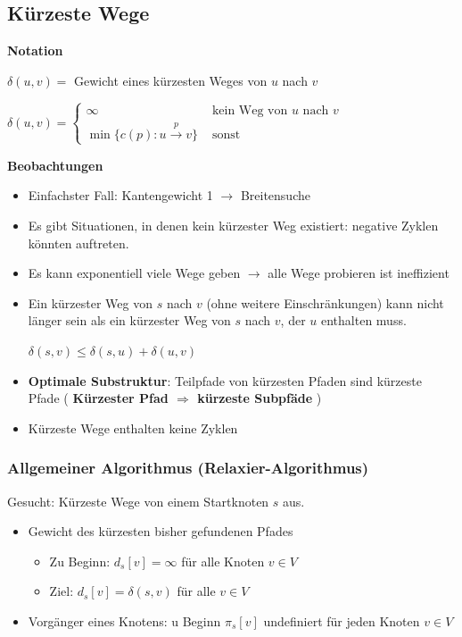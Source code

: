 \vspace{-4pt}
\begin{sectionbox}
\subsection{Kürzeste Wege}\smallskip
\textbf{Notation}\par\smallskip
$\delta(u, v)=$ Gewicht eines kürzesten Weges von $u$ nach $v$\par
$\delta(u, v)=\left\{\begin{array}{ll}
\infty & \text { kein Weg von } u \text { nach } v \\
\min \{c(p): u \stackrel{p}{\longrightarrow} v\} & \text { sonst }
\end{array}\right.$\par\smallskip

\textbf{Beobachtungen}\par
\begin{itemize}
    \item Einfachster Fall: Kantengewicht 1 $\rightarrow$ Breitensuche
    \item Es gibt Situationen, in denen kein kürzester Weg existiert: negative Zyklen könnten auftreten.
    \item Es kann exponentiell viele Wege geben $\rightarrow$  alle Wege probieren ist ineffizient
    \item Ein kürzester Weg von $s$ nach $v$ (ohne weitere Einschränkungen) kann nicht länger sein als ein kürzester Weg von $s$ nach $v$, der $u$ enthalten muss.\par
    \textcolor{tanne}{\textbf{$\delta(s, v) \leq \delta(s, u)+\delta(u, v)$}}
    \item \textbf{Optimale Substruktur}: Teilpfade von kürzesten Pfaden sind kürzeste Pfade ( \textbf{\textcolor{tanne}{Kürzester Pfad $\Rightarrow$ kürzeste Subpfäde}} )
    \item Kürzeste Wege enthalten keine Zyklen
\end{itemize}\par
\end{sectionbox}
\vspace{-4pt}
\begin{sectionbox}
\subsubsection{Allgemeiner Algorithmus (Relaxier-Algorithmus)}\smallskip
Gesucht: Kürzeste Wege von einem Startknoten $s$ aus.
\begin{itemize}
    \item Gewicht des kürzesten bisher gefundenen Pfades
    \begin{itemize}
        \item Zu Beginn: $d_{s}[v]=\infty$ für alle Knoten $v \in V$
        \item Ziel: $d_{s}[v]=\delta(s, v)$ für alle $v \in V$
    \end{itemize}
    \item Vorgänger eines Knotens: u Beginn $\pi_{s}[v]$ undefiniert für jeden Knoten $v \in V$
\end{itemize}\smallskip
\end{sectionbox}
